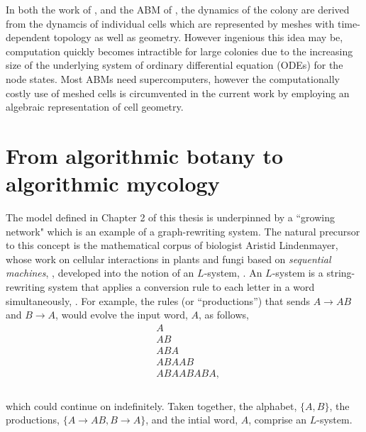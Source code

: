 In both the work of \cite{van2020quantitative}, and the ABM of 
\cite{brown2021rigid}, the dynamics of the colony 
are derived from the dynamcis of individual cells which are represented
by meshes with time-dependent topology as well as geometry. However ingenious this idea may be, 
computation quickly becomes intractible for large colonies
due to the increasing size of the underlying system of ordinary differential equation (ODEs)
for the node states. Most ABMs need supercomputers, however
the computationally costly use of meshed cells is circumvented in the current work by employing 
an algebraic representation of cell geometry.
\\

\section{From algorithmic botany to algorithmic mycology}

The model defined in Chapter 2 of this thesis is underpinned by a ``growing network" which is an example 
of a graph-rewriting system. The natural precursor 
to this concept is the mathematical corpus of biologist Aristid Lindenmayer, whose work 
on cellular interactions in plants and fungi based on \textit{sequential machines}, 
\cite{lindenmayer1968mathematical}, developed 
into the notion of an $L$-system, \cite{prusinkiewicz2012algorithmic}. An $L$-system
is a string-rewriting system that applies a conversion rule to each letter in a word 
simultaneously, \cite{prusinkiewicz2012algorithmic}. For example,
the rules (or ``productions'') that sends $A \rightarrow AB$ and $B \rightarrow A$,
would evolve the input word, $A$, as follows,
\begin{equation*}
\begin{split}
&A \\
&AB \\
&ABA \\
&ABAAB \\
&ABAABABA, \\
\end{split}
\end{equation*}
\\
which could continue on indefinitely. Taken together,
the alphabet, $\{A, B\}$, the productions, $\{ A \rightarrow AB, B \rightarrow A \}$, and 
the intial word, $A$, comprise an $L$-system. 
\\

